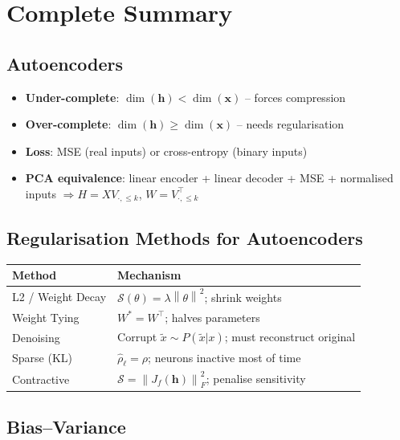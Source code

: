 \documentclass[12pt,a4paper]{article}
\newcommand{\norm}[1]{\left\|#1\right\|}
\newcommand{\vx}{\mathbf{x}}
\newcommand{\vh}{\mathbf{h}}
\newcommand{\Reg}{\mathcal{S}}
\begin{document}
\section{Complete Summary}

\subsection{Autoencoders}

\begin{itemize}
  \item \textbf{Under-complete}: $\dim(\vh) < \dim(\vx)$ -- forces compression
  \item \textbf{Over-complete}: $\dim(\vh) \geq \dim(\vx)$ -- needs regularisation
  \item \textbf{Loss}: MSE (real inputs) or cross-entropy (binary inputs)
  \item \textbf{PCA equivalence}: linear encoder + linear decoder + MSE + normalised inputs
    $\Rightarrow H = XV_{\cdot,\leq k}$, $W = V_{\cdot,\leq k}^\top$
\end{itemize}

\subsection{Regularisation Methods for Autoencoders}

\begin{center}
\begin{tabular}{lp{6cm}}
\toprule
\textbf{Method} & \textbf{Mechanism} \\
\midrule
L2 / Weight Decay & $\Reg(\theta) = \lambda\norm{\theta}^2$; shrink weights \\
Weight Tying & $W^* = W^\top$; halves parameters \\
Denoising & Corrupt $\tilde{x}\sim P(\tilde{x}|x)$; must reconstruct original \\
Sparse (KL) & $\hat{\rho}_\ell = \rho$; neurons inactive most of time \\
Contractive & $\Reg = \norm{J_f(\vh)}_F^2$; penalise sensitivity \\
\bottomrule
\end{tabular}
\end{center}

\subsection{Bias--Variance}
\end{document}
